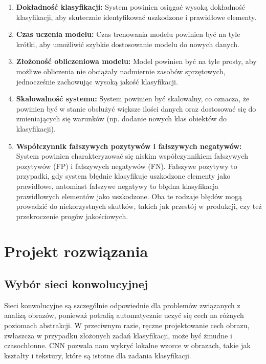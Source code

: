 \begin{enumerate}

\item \textbf{Dokładność klasyfikacji:} System powinien osiągać wysoką dokładność klasyfikacji, aby skutecznie identyfikować uszkodzone i prawidłowe elementy.

\item \textbf{Czas uczenia modelu:} Czas trenowania modelu powinien być na tyle krótki, aby umożliwić szybkie dostosowanie modelu do nowych danych.

\item \textbf{Złożoność obliczeniowa modelu:} Model powinien być na tyle prosty, aby możliwe obliczenia nie obciążały nadmiernie zasobów sprzętowych, jednocześnie zachowując wysoką jakość klasyfikacji.

\item \textbf{Skalowalność systemu:} System powinien być skalowalny, co oznacza, że powinien być w stanie obsłużyć większe ilości danych oraz dostosować się do zmieniających się warunków (np. dodanie nowych klas obiektów do klasyfikacji).

\item \textbf{Współczynnik fałszywych pozytywów i fałszywych negatywów:} System powinien charakteryzować się niskim współczynnikiem fałszywych pozytywów (FP) i fałszywych negatywów (FN). Fałszywe pozytywy to przypadki, gdy system błędnie klasyfikuje uszkodzone elementy jako prawidłowe, natomiast fałszywe negatywy to błędna klasyfikacja prawidłowych elementów jako uszkodzone. Oba te rodzaje błędów mogą prowadzić do niekorzystnych skutków, takich jak przestój w produkcji, czy też przekroczenie progów jakościowych.

\end{enumerate}

\chapter{Projekt rozwiązania}

\section{Wybór sieci konwolucyjnej}
Sieci konwolucyjne są szczególnie odpowiednie dla problemów związanych z analizą obrazów, ponieważ potrafią automatycznie uczyć się cech na różnych poziomach abstrakcji. W przeciwnym razie, ręczne projektowanie cech obrazu, zwłaszcza w przypadku złożonych zadań klasyfikacji, może być żmudne i czasochłonne. CNN pozwala nam wykryć lokalne wzorce w obrazach, takie jak kształty i tekstury, które są istotne dla zadania klasyfikacji.

